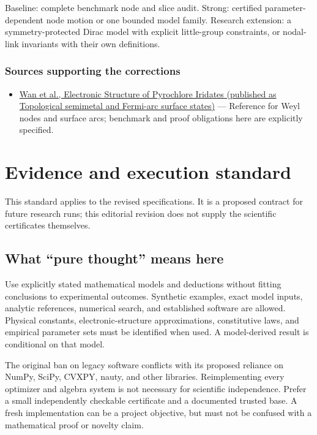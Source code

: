 \documentclass[
  11pt,
]{article}
\providecommand{\tightlist}{%
  \setlength{\itemsep}{0pt}\setlength{\parskip}{0pt}}
\begin{document}
Baseline: complete benchmark node and slice audit. Strong: certified
parameter-dependent node motion or one bounded model family. Research
extension: a symmetry-protected Dirac model with explicit little-group
constraints, or nodal-link invariants with their own definitions.

\subsubsection{Sources supporting the corrections}

\begin{itemize}
\tightlist
\item
  \href{https://arxiv.org/abs/1007.0016}{Wan et al., Electronic
  Structure of Pyrochlore Iridates (published as Topological semimetal
  and Fermi-arc surface states)} --- Reference for Weyl nodes and
  surface arcs; benchmark and proof obligations here are explicitly
  specified.
\end{itemize}

\section{Evidence and execution standard}

This standard applies to the revised specifications. It is a proposed
contract for future research runs; this editorial revision does not
supply the scientific certificates themselves.

\subsection{What ``pure thought'' means here}

Use explicitly stated mathematical models and deductions without fitting
conclusions to experimental outcomes. Synthetic examples, exact model
inputs, analytic references, numerical search, and established software
are allowed. Physical constants, electronic-structure approximations,
constitutive laws, and empirical parameter sets must be identified when
used. A model-derived result is conditional on that model.

The original ban on legacy software conflicts with its proposed reliance
on NumPy, SciPy, CVXPY, nauty, and other libraries. Reimplementing every
optimizer and algebra system is not necessary for scientific
independence. Prefer a small independently checkable certificate and a
documented trusted base. A fresh implementation can be a project
objective, but must not be confused with a mathematical proof or novelty
claim.
\end{document}
